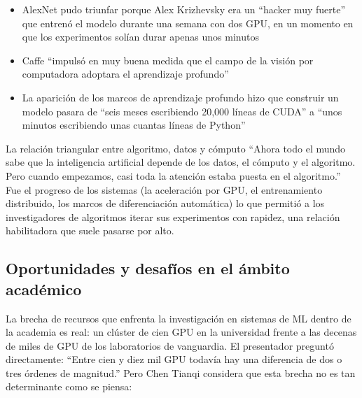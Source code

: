 \documentclass[a4paper]{article}
\begin{document}
\begin{itemize}
    \item AlexNet pudo triunfar porque Alex Krizhevsky era un ``hacker muy fuerte'' que entrenó el modelo durante una semana con dos GPU, en un momento en que los experimentos solían durar apenas unos minutos
    \item Caffe ``impulsó en muy buena medida que el campo de la visión por computadora adoptara el aprendizaje profundo''
    \item La aparición de los marcos de aprendizaje profundo hizo que construir un modelo pasara de ``seis meses escribiendo 20,000 líneas de CUDA'' a ``unos minutos escribiendo unas cuantas líneas de Python''
\end{itemize}

\begin{importantbox}{La relación triangular entre algoritmo, datos y cómputo}
``Ahora todo el mundo sabe que la inteligencia artificial depende de los datos, el cómputo y el algoritmo. Pero cuando empezamos, casi toda la atención estaba puesta en el algoritmo.'' Fue el progreso de los sistemas (la aceleración por GPU, el entrenamiento distribuido, los marcos de diferenciación automática) lo que permitió a los investigadores de algoritmos iterar sus experimentos con rapidez, una relación habilitadora que suele pasarse por alto.
\end{importantbox}

\subsection{Oportunidades y desafíos en el ámbito académico}

La brecha de recursos que enfrenta la investigación en sistemas de ML dentro de la academia es real: un clúster de cien GPU en la universidad frente a las decenas de miles de GPU de los laboratorios de vanguardia. El presentador preguntó directamente: ``Entre cien y diez mil GPU todavía hay una diferencia de dos o tres órdenes de magnitud.'' Pero Chen Tianqi considera que esta brecha no es tan determinante como se piensa:
\end{document}
